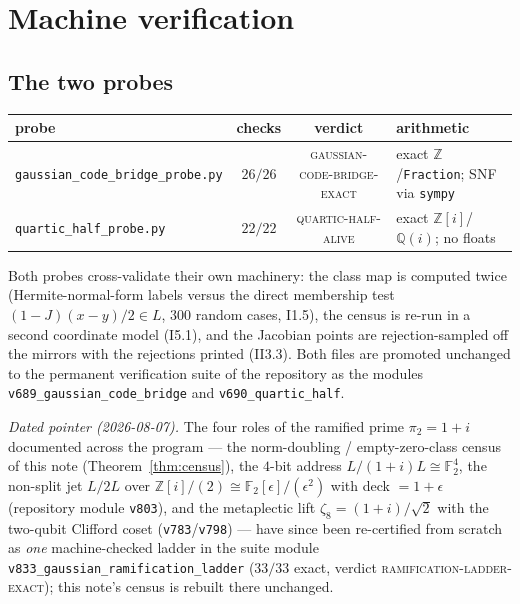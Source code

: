 \documentclass[11pt,a4paper]{article}
\theoremstyle{remark}
\newcommand{\Z}{\mathbb Z}
\begin{document}
\section{Machine verification}\label{sec:verification}

\subsection{The two probes}
\begin{center}
\footnotesize
\setlength{\tabcolsep}{4pt}
\begin{tabular}{@{}lccl@{}}
\toprule
probe & checks & verdict & arithmetic\\
\midrule
\texttt{gaussian\_code\_bridge\_probe.py} & $26/26$ &
\textsc{gaussian-code-bridge-exact} &
exact $\Z$/\texttt{Fraction}; SNF via \texttt{sympy}\\
\texttt{quartic\_half\_probe.py} & $22/22$ &
\textsc{quartic-half-alive} &
exact $\Z[i]$/$\mathbb Q(i)$; no floats\\
\bottomrule
\end{tabular}
\end{center}
Both probes cross-validate their own machinery: the class map is
computed twice (Hermite-normal-form labels versus the direct
membership test $(1-J)(x-y)/2\in L$, $300$ random cases, I1.5), the
census is re-run in a second coordinate model (I5.1), and the
Jacobian points are rejection-sampled off the mirrors with the
rejections printed (II3.3).  Both files are promoted unchanged to the
permanent verification suite of the repository \cite{TFPT} as the
modules \texttt{v689\_gaussian\_code\_bridge} and
\texttt{v690\_quartic\_half}.

\emph{Dated pointer (2026-08-07).}  The four roles of the ramified
prime $\pi_2=1+i$ documented across the program --- the norm-doubling
/ empty-zero-class census of this note (Theorem~\ref{thm:census}),
the $4$-bit address $L/(1+i)L\cong\mathbb F_2^4$, the non-split jet
$L/2L$ over $\Z[i]/(2)\cong\mathbb F_2[\epsilon]/(\epsilon^2)$ with
deck $=1+\epsilon$ (repository module \texttt{v803}), and the
metaplectic lift $\zeta_8=(1+i)/\sqrt2$ with the two-qubit Clifford
coset (\texttt{v783}/\texttt{v798}) --- have since been re-certified
from scratch as \emph{one} machine-checked ladder in the suite module
\texttt{v833\_gaussian\_ramification\_ladder} ($33/33$ exact,
verdict \textsc{ramification-ladder-exact}); this note's census is
rebuilt there unchanged.
\end{document}

